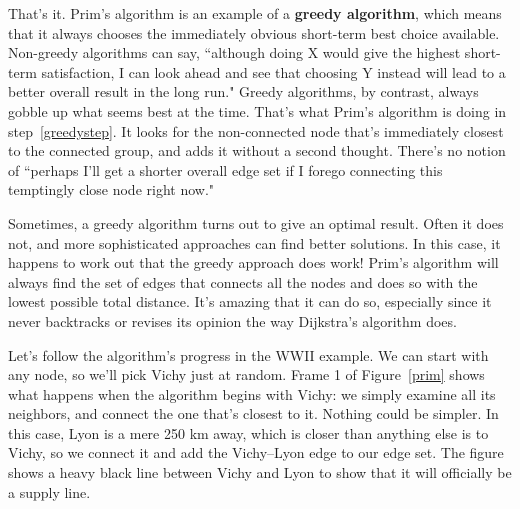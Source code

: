 That's it. Prim's algorithm is an example of a \textbf{greedy algorithm},
which means that it always chooses the immediately obvious short-term best
choice available. Non-greedy algorithms can say, ``although doing X would
give the highest short-term satisfaction, I can look ahead and see that
choosing Y instead will lead to a better overall result in the long run."
Greedy algorithms, by contrast, always gobble up what seems best at the
time. That's what Prim's algorithm is doing in step~\ref{greedystep}. It
looks for the non-connected node that's immediately closest to the
connected group, and adds it without a second thought. There's no notion of
``perhaps I'll get a shorter overall edge set if I forego connecting this
temptingly close node right now."

Sometimes, a greedy algorithm turns out to give an optimal result. Often it
does not, and more sophisticated approaches can find better solutions.  In
this case, it happens to work out that the greedy approach does work!
Prim's algorithm will always find the set of edges that connects all the
nodes and does so with the lowest possible total distance. It's amazing
that it can do so, especially since it never backtracks or revises its
opinion the way Dijkstra's algorithm does.

Let's follow the algorithm's progress in the WWII example. We can start
with any node, so we'll pick Vichy just at random. Frame 1 of
Figure~\ref{prim} shows what happens when the algorithm begins with Vichy:
we simply examine all its neighbors, and connect the one that's closest to
it. Nothing could be simpler. In this case, Lyon is a mere 250 km away,
which is closer than anything else is to Vichy, so we connect it and add
the Vichy--Lyon edge to our edge set. The figure shows a heavy black line
between Vichy and Lyon to show that it will officially be a supply line.

